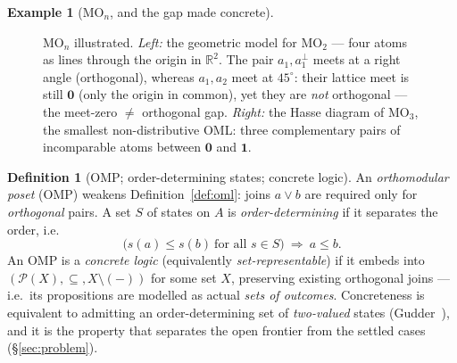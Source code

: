 \documentclass[11pt,reqno]{amsart}
\theoremstyle{plain}
\theoremstyle{definition}
\newtheorem{definition}[theorem]{Definition}
\newtheorem{example}[theorem]{Example}
\theoremstyle{remark}
\begin{document}
\begin{example}[$\mathrm{MO}_n$, and the gap made concrete]
\begin{figure}[h]
\caption{$\mathrm{MO}_n$ illustrated. \emph{Left:} the geometric model for
$\mathrm{MO}_2$ --- four atoms as lines through the origin in $\mathbb R^2$.
The pair $a_1,a_1^\perp$ meets at a right angle (orthogonal), whereas
$a_1,a_2$ meet at $45^\circ$: their lattice meet is still $\mathbf 0$ (only the
origin in common), yet they are \emph{not} orthogonal --- the meet-zero
$\neq$ orthogonal gap. \emph{Right:} the Hasse diagram of $\mathrm{MO}_3$,
the smallest non-distributive OML: three complementary pairs of incomparable
atoms between $\mathbf 0$ and $\mathbf 1$.}
\label{fig:mo}
\end{figure}
\end{example}

\begin{definition}[OMP; order-determining states; concrete logic]\label{def:omp}
An \emph{orthomodular poset} (OMP) weakens Definition~\ref{def:oml}: joins
$a \vee b$ are required only for \emph{orthogonal} pairs. A set $S$ of states
on $A$ is \emph{order-determining} if it separates the order, i.e.
\[
  \bigl(s(a)\leq s(b)\ \text{for all } s\in S\bigr)\ \Longrightarrow\ a\leq b.
\]
An OMP is a \emph{concrete logic} (equivalently \emph{set-representable}) if it
embeds into $(\mathcal P(X), \subseteq, X \setminus(-))$ for some set $X$,
preserving existing orthogonal joins --- i.e.\ its propositions are modelled as
actual \emph{sets of outcomes}. Concreteness is equivalent to admitting an
order-determining set of \emph{two-valued} states (Gudder~\cite{Gudder1979}),
and it is the property that separates the open frontier from the settled cases
(\S\ref{sec:problem}).
\end{definition}
\end{document}

